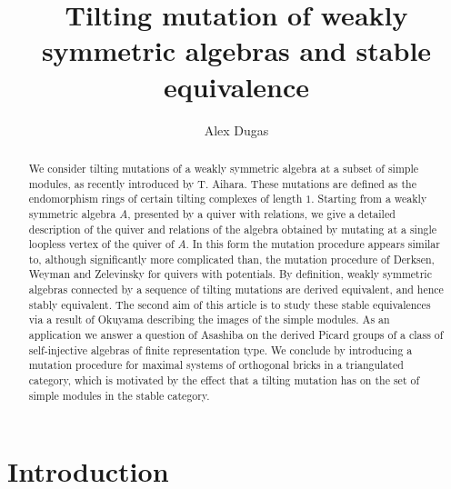 \documentclass{amsart}
\begin{document}

 \usepackage{./extract}
\newtheorem{therm}{Theorem}[section]
\newtheorem{defin}[therm]{Definition}
\newtheorem{propos}[therm]{Proposition}
\newtheorem{lemma}[therm]{Lemma}
\newtheorem{coro}[therm]{Corollary}

\title{Tilting mutation of weakly symmetric algebras and stable equivalence}
\author{Alex Dugas}
\address{Department of Mathematics, University of the Pacific, 3601 Pacific Ave, Stockton CA 95211, USA}


\begin{abstract} We consider tilting mutations of a weakly symmetric algebra at a subset of simple modules, as recently introduced by T. Aihara.  These mutations are defined as the endomorphism rings of certain tilting complexes of length $1$.  Starting from a weakly symmetric algebra $A$, presented by a quiver with relations, we give a detailed description of the quiver and relations of the algebra obtained by mutating at a single loopless vertex of the quiver of $A$.  In this form the mutation procedure appears similar to, although significantly more complicated than, the mutation procedure of Derksen, Weyman and Zelevinsky for quivers with potentials.  By definition, weakly symmetric algebras connected by a sequence of tilting mutations are derived equivalent, and hence stably equivalent.  The second aim of this article is to study these stable equivalences via a result of Okuyama describing the images of the simple modules.   As an application we answer a question of Asashiba on the derived Picard groups of a class of self-injective algebras of finite representation type.  We conclude by introducing a mutation procedure for maximal systems of orthogonal bricks in a triangulated category, which is motivated by the effect that a tilting mutation has on the set of simple modules in the stable category.
  \end{abstract}

\maketitle
 
 \section{Introduction}
 
\end{document}
